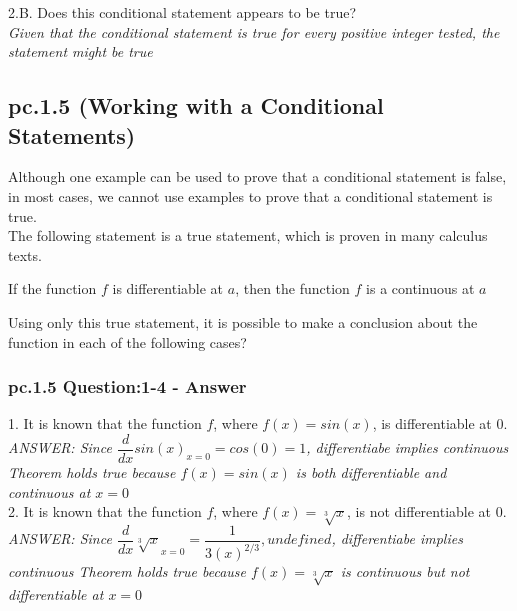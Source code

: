 2.B. Does this conditional statement appears to be true? \\
{\it Given that the conditional statement is true for every positive integer tested, the statement might be true} \\

\newpage
\subsection{pc.1.5 (Working with a Conditional Statements)}

Although one example can be used to prove that a conditional statement is false, in most cases, we cannot use examples to prove that a conditional statement is true.  \\

The following statement is a true statement, which is proven in many calculus texts. \\

\begin{tcolorbox}
\begin{theorem}
If the function $f$ is differentiable at $a$, then the function $f$ is a continuous at $a$
\end{theorem}
\end{tcolorbox}

Using only this true statement, it is possible to make a conclusion about the function in each of the following cases? \\

\subsubsection*{pc.1.5 Question:1-4 - Answer}

1. It is known that the function $f$, where $f(x)= sin(x)$, is differentiable at 0. \\
{\it ANSWER: Since $\dfrac{d}{dx}sin(x)_{x=0}=cos(0)=1$, differentiabe implies continuous Theorem holds true because $f(x)= sin(x)$ is both differentiable and continuous at $x=0$ } \\

2. It is known that the function $f$, where $f(x)= \sqrt[3]{x}$, is not differentiable at 0. \\
{\it ANSWER: Since $\dfrac{d}{dx}\sqrt[3]{x}_{x=0}= \dfrac{1}{3(x)^{2/3}}, undefined$, differentiabe implies continuous Theorem holds true because $f(x)= \sqrt[3]{x}$ is continuous but not differentiable at $x=0$ } \\

